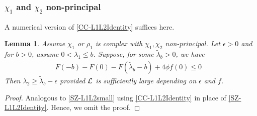 \documentclass[12pt,psamsfonts]{amsart}
\newtheorem{lem}[thm]{Lemma}
\theoremstyle{definition}
\theoremstyle{remark}
\numberwithin{equation}{section}
\begin{document}
\subsubsection{$\chi_1$ and $\chi_2$ non-principal}

A numerical version of \cref{CC-L1L2Identity} suffices here. 

\begin{lem} \label{CC-L1L2small_Chi1Chi2NonPrincipal} Assume $\chi_1$ or $\rho_1$ is complex with $\chi_1, \chi_2$ non-principal. Let $\epsilon > 0$ and for $b > 0$, assume $0 < \lambda_1 \leq b$. Suppose, for some $\tilde{\lambda}_b > 0$, we have 
\[
\begin{array}{ll}
 F(-b) - F(0)- F(\tilde{\lambda}_b-b) +   4 \phi f(0) \leq 0 & %
\end{array}
\]
Then $\lambda_2 \geq \tilde{\lambda}_b - \epsilon$ provided $\mathcal{L}$ is sufficiently large depending on $\epsilon$ and $f$.
\end{lem}
\begin{proof} Analogous to \cref{SZ-L1L2small} using \cref{CC-L1L2Identity} in place of \cref{SZ-L1L2Identity}. Hence, we omit the proof.  
\end{proof}
\end{document}
